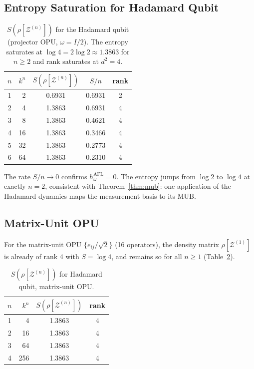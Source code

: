 \documentclass[12pt,a4paper]{article}
\begin{document}
\subsection{Entropy Saturation for Hadamard Qubit}

\begin{table}[h]
\centering
\caption{$S(\rho[\mathcal{Z}^{(n)}])$ for the Hadamard qubit (projector OPU,
$\omega=I/2$).  The entropy saturates at $\log 4=2\log 2\approx 1.3863$ for
$n\geq 2$ and rank saturates at $d^2=4$.}
\label{tab:hadamard}
\begin{tabular}{c|r|c|c|c}
$n$ & $k^n$ & $S(\rho[\mathcal{Z}^{(n)}])$ & $S/n$ & rank \\ \hline
1 & 2   & 0.6931 & 0.6931 & 2 \\
2 & 4   & 1.3863 & 0.6931 & 4 \\
3 & 8   & 1.3863 & 0.4621 & 4 \\
4 & 16  & 1.3863 & 0.3466 & 4 \\
5 & 32  & 1.3863 & 0.2773 & 4 \\
6 & 64  & 1.3863 & 0.2310 & 4
\end{tabular}
\end{table}

The rate $S/n\to 0$ confirms $h_\omega^{\mathrm{AFL}}=0$.  The entropy jumps
from $\log 2$ to $\log 4$ at exactly $n=2$, consistent with
Theorem~\ref{thm:mub}: one application of the Hadamard dynamics maps the
measurement basis to its MUB.

\subsection{Matrix-Unit OPU}

For the matrix-unit OPU $\{e_{ij}/\sqrt{2}\}$ (16 operators), the density
matrix $\rho[\mathcal{Z}^{(1)}]$ is already of rank 4 with $S=\log 4$, and
remains so for all $n\geq 1$ (Table~\ref{tab:matunit}).

\begin{table}[h]
\centering
\caption{$S(\rho[\mathcal{Z}^{(n)}])$ for Hadamard qubit, matrix-unit OPU.}
\label{tab:matunit}
\begin{tabular}{c|r|c|c}
$n$ & $k^n$ & $S(\rho[\mathcal{Z}^{(n)}])$ & rank \\ \hline
1 & 4   & 1.3863 & 4 \\
2 & 16  & 1.3863 & 4 \\
3 & 64  & 1.3863 & 4 \\
4 & 256 & 1.3863 & 4
\end{tabular}
\end{table}
\end{document}
